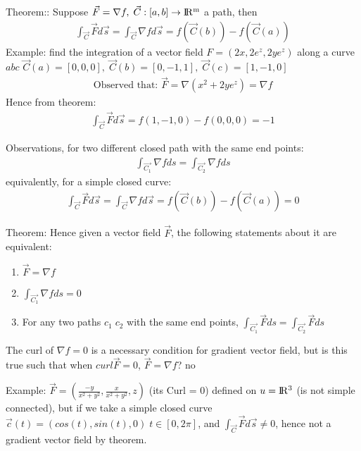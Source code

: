 \documentclass{article}
\newcommand{\R}{\rm I\!R}
\begin{document}
        Theorem:: Suppose $\vec{F} = \nabla f,\;\vec{C}:[a,b]\rightarrow\R^m$ a path, then
        \begin{align}
            \int_{\vec{C}}\vec{F}d\vec{s} = \int_{\vec{C}}\nabla f d\vec{s} = f(\vec{C}(b))-f(\vec{C}(a))
        \end{align}
        Example: find the integration of a vector field $F = (2x,2e^z,2ye^z)$ along a curve $abc$ $\vec{C}(a) = [0,0,0],\;\vec{C}(b) = [0,-1,1],\;\vec{C}(c) = [1,-1,0]$
        \begin{align}
            \text{Observed that: } \vec{F} = \nabla (x^2+2ye^z) = \nabla f
        \end{align}
        Hence from theorem:
        \begin{align}
            \int_{\vec{C}}\vec{F}d\vec{s} = f(1,-1,0)-f(0,0,0) = -1
        \end{align}
        
        Observations, for two different closed path with the same end points:
        \begin{align}
            \int_{\vec{C_1}}\nabla fds = \int_{\vec{C_2}}\nabla fds
        \end{align}
        equivalently, for a simple closed curve:
        \begin{align}
            \int_{\vec{C}}\vec{F}d\vec{s} = \int_{\vec{C}}\nabla f d\vec{s} = f(\vec{C}(b))-f(\vec{C}(a)) = 0
        \end{align}
        
        Theorem: Hence given a vector field $\vec{F}$, the following statements about it are equivalent:
        \begin{enumerate}
            \item $\vec{F} = \nabla f$
            \item $\int_{\vec{C_1}}\nabla fds = 0$
            \item For any two paths $c_1\;c_2$ with the same end points, $\int_{\vec{C_1}}\vec{F}ds = \int_{\vec{C_2}}\vec{F}ds$
        \end{enumerate}
        
        The curl of $\nabla f = 0$ is a necessary condition for gradient vector field, but is this true such that when $curl \vec{F} = 0$, $\vec{F} = \nabla f$? no
        
        Example: $\vec{F} = (\frac{-y}{x^2+y^2},\frac{x}{x^2+y^2},z)$ (its Curl = 0) defined on $u = \R^3$ (is not simple connected), but if we take a simple closed curve $\vec{c}(t) = (cos(t),sin(t),0)\;t\in[0,2\pi]$, and $\int_{\vec{C}}\vec{F}d\vec{s} \neq 0$, hence not a gradient vector field by theorem.
        
\end{document}

